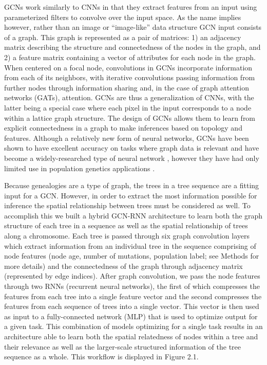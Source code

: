 GCNs work similarly to CNNs in that they extract features from an input using parameterized filters to convolve over the input space. As the name implies however, rather than an image or “image-like” data structure GCN input consists of a graph. This graph is represented as a pair of matrices: 1) an adjacency matrix describing the structure and connectedness of the nodes in the graph, and 2) a feature matrix containing a vector of attributes for each node in the graph. When centered on a focal node, convolutions in GCNs incorporate information from each of its neighbors, with iterative convolutions passing information from further nodes through information sharing and, in the case of graph attention networks (GATs), attention. GCNs are thus a generalization of CNNs, with the latter being a special case where each pixel in the input corresponds to a node within a lattice graph structure. The design of GCNs allows them to learn from explicit connectedness in a graph to make inferences based on topology and features. Although a relatively new form of neural networks, GCNs have been shown to have excellent accuracy on tasks where graph data is relevant and have become a widely-researched type of neural network \cite{zhouGraphNeuralNetworks2020}, however they have had only limited use in population genetics applications \cite{korfmannDeepLearningPopulation2023a,korfmannSimultaneousInferenceDemography2023}.

Because genealogies are a type of graph, the trees in a tree sequence are a fitting input for a GCN. However, in order to extract the most information possible for inference the spatial relationship between trees must be considered as well. To accomplish this we built a hybrid GCN-RNN architecture to learn both the graph structure of each tree in a sequence as well as the spatial relationship of trees along a chromosome. Each tree is passed through six graph convolution layers which extract information from an individual tree in the sequence comprising of node features (node age, number of mutations, population label; see Methods for more details) and the connectedness of the graph through adjacency matrix (represented by edge indices). After graph convolution, we pass the node features through two RNNs (recurrent neural networks), the first of which compresses the features from each tree into a single feature vector and the second compresses the features from each sequence of trees into a single vector. This vector is then used as input to a fully-connected network (MLP) that is used to optimize output for a given task. This combination of models optimizing for a single task results in an architecture able to learn both the spatial relatedness of nodes within a tree and their relevance as well as the larger-scale structured information of the tree sequence as a whole. This workflow is displayed in Figure 2.1.

